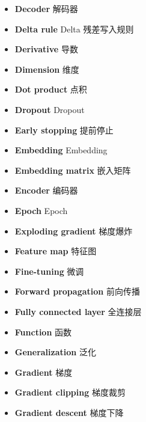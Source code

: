\begin{itemize}[leftmargin=1.2em,itemsep=2pt,topsep=3pt]
\item {\sffamily\bfseries Decoder} \quad 解码器\quad {}
\item {\sffamily\bfseries Delta rule} \quad Delta 残差写入规则\quad {}
\item {\sffamily\bfseries Derivative} \quad 导数\quad {}
\item {\sffamily\bfseries Dimension} \quad 维度\quad {}
\item {\sffamily\bfseries Dot product} \quad 点积\quad {}
\item {\sffamily\bfseries Dropout} \quad Dropout\quad {}
\item {\sffamily\bfseries Early stopping} \quad 提前停止\quad {}
\item {\sffamily\bfseries Embedding} \quad Embedding\quad {}
\item {\sffamily\bfseries Embedding matrix} \quad 嵌入矩阵\quad {}
\item {\sffamily\bfseries Encoder} \quad 编码器\quad {}
\item {\sffamily\bfseries Epoch} \quad Epoch\quad {}
\item {\sffamily\bfseries Exploding gradient} \quad 梯度爆炸\quad {}
\item {\sffamily\bfseries Feature map} \quad 特征图\quad {}
\item {\sffamily\bfseries Fine-tuning} \quad 微调\quad {}
\item {\sffamily\bfseries Forward propagation} \quad 前向传播\quad {}
\item {\sffamily\bfseries Fully connected layer} \quad 全连接层\quad {}
\item {\sffamily\bfseries Function} \quad 函数\quad {}
\item {\sffamily\bfseries Generalization} \quad 泛化\quad {}
\item {\sffamily\bfseries Gradient} \quad 梯度\quad {}
\item {\sffamily\bfseries Gradient clipping} \quad 梯度裁剪\quad {}
\item {\sffamily\bfseries Gradient descent} \quad 梯度下降\quad {}

\end{itemize}
